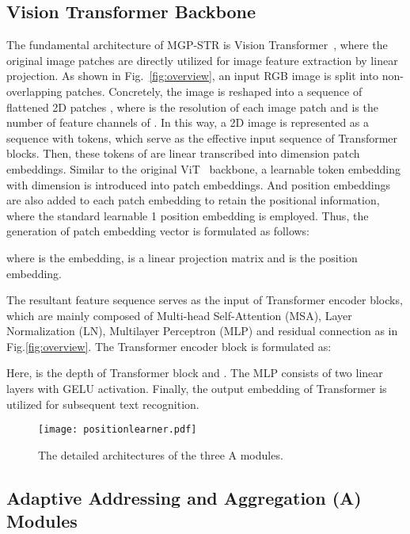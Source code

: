 \documentclass[runningheads]{llncs}
\begin{document}
\subsection{Vision Transformer Backbone}
The fundamental architecture of MGP-STR is Vision Transformer~\cite{dosovitskiy2020image,deit}, where the original image patches are directly utilized for image feature extraction by linear projection. 
As shown in Fig.~\ref{fig:overview}, an input RGB image    is split into non-overlapping patches.
Concretely, the image is reshaped  into a sequence of flattened 2D patches ,
where  is the resolution of each image patch and  is the number of feature channels of . 
In this way, a 2D image is represented as a sequence with  tokens, which serve as the effective input sequence of Transformer blocks.
Then, these tokens of   are linear transcribed into  dimension patch embeddings. 
Similar to the original ViT~\cite{dosovitskiy2020image} backbone, a learnable   token embedding with  dimension is introduced into patch embeddings.
And position embeddings are also added to each patch embedding to retain the positional information,
where the standard learnable 1 position embedding is employed.
Thus, the generation of patch embedding vector is formulated as follows:

where  is the  embedding,   is a linear projection matrix and   is the position embedding.

The resultant feature sequence  serves as the input of Transformer encoder blocks,
which are mainly composed of Multi-head Self-Attention (MSA), Layer Normalization (LN), Multilayer Perceptron (MLP) and residual connection as in Fig.\ref{fig:overview}. The Transformer encoder block is formulated as:

Here,  is the depth of Transformer block and  .
The MLP consists of two linear layers with GELU activation.
Finally, the output embedding  of Transformer is utilized for subsequent text recognition.

\begin{figure}[t]\centering
 \texttt{[image: positionlearner.pdf]}
 \caption{The detailed architectures of the three A modules. }
 \label{fig:token}
\end{figure}

\subsection{ Adaptive Addressing and Aggregation (A) Modules} \label{sec:token}
\end{document}
